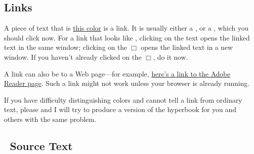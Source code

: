 \documentclass[fleqn,leqno]{article}
\begin{document}
\subsection*{Links}

A piece of text that is 
{\hypersetup{pdfnewwindow=true}%
 \hyperref{help-1.pdf}{}{}{\linkcolor this color}}
is a link.  It is usually either a , or a , which you
should click now.  For a link that looks like
, clicking on the text
opens the linked text in the same window; clicking on the $\Box$ opens
the linked text in a new window.  If you haven't already clicked on
the $\Box$, do it now.

A link can also be to a Web page---for example,
\hyperref{http://get.adobe.com/reader/}{}{}{\linkcolor here's a link
to the Adobe Reader page}.  Such a link might not work unless your
browser is already running.

If you have difficulty distinguishing colors and cannot tell a
link from ordinary text, please 
  \hyperref{http://lamport.org}{}{}{\linkcolor {}}
and I will try to produce a version of the hyperbook for you and
others with the same problem.


%
% 
%




% 

\subsection*{\protect\tlaplus\ Source Text}
\end{document}
